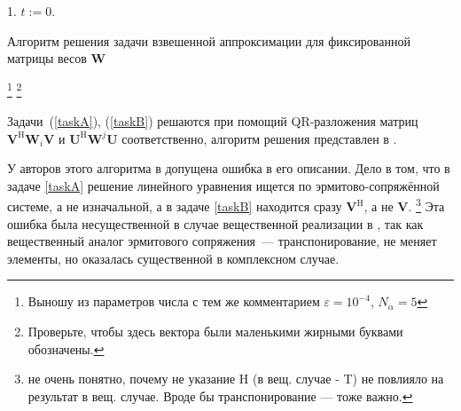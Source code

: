 \documentclass[specialist,
               substylefile = spbu.rtx,
               subf,href,colorlinks=true, 12pt]{disser}
\begin{document}
\begin{algorithm}[H]\label{alg}
	\SetAlgoLined
	
	1. $t:=0$. 
	\caption{Алгоритм решения задачи взвешенной аппроксимации для фиксированной матрицы весов $\mathbf{W}$}
\end{algorithm}

\footnote{Выношу из параметров числа с тем же комментарием $\varepsilon = 10^{-4}$, $N_\alpha = 5$}
\footnote{Проверьте, чтобы здесь вектора были маленькими жирными буквами обозначены.}

Задачи~(\ref{taskA}), (\ref{taskB}) решаются при помощий QR-разложения матриц $\mathbf{V}^\mathrm{H}\mathbf{W}_i\mathbf{V}$ и $\mathbf{U}^\mathrm{H}\mathbf{W}^j\mathbf{U}$ соответственно, алгоритм решения представлен в \cite{IRLS}.

У авторов этого алгоритма в \cite{Chen} допущена ошибка в его описании. Дело в том, что в задаче \eqref{taskA} решение линейного уравнения ищется по эрмитово-сопряжённой системе, а не изначальной, а в задаче \eqref{taskB} находится сразу $\mathbf{V}^\mathrm{H}$, а не $\mathbf{V}$. 
\footnote{не очень понятно, почему не указание H (в вещ. случае - T) не повлияло на результат в вещ. случае. Вроде бы транспонирование --- тоже важно.}
Эта ошибка была несущественной в случае вещественной реализации в \cite{Tretyakova20}, так как вещественный аналог эрмитового сопряжения~--- транспонирование, не меняет элементы, но оказалась существенной в комплексном случае.
\end{document}
